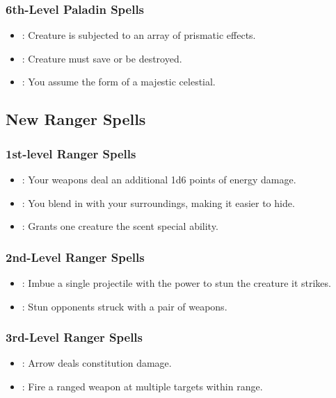 \subsubsection{6th-Level Paladin Spells}
\begin{itemize}
 \item {}: Creature is subjected to an array of prismatic effects.
 \item {}: Creature must save or be destroyed.
 \item {}: You assume the form of a majestic celestial.
\end{itemize}


\subsection{New Ranger Spells}
\subsubsection{1st-level Ranger Spells}
\begin{itemize}
 \item {}: Your weapons deal an additional 1d6 points of energy damage.
 \item {}: You blend in with your surroundings, making it easier to hide.
 \item {}: Grants one creature the scent special ability.
\end{itemize}
\subsubsection{2nd-Level Ranger Spells}
\begin{itemize}
 \item {}: Imbue a single projectile with the power to stun the creature it strikes.
 \item {}: Stun opponents struck with a pair of weapons.
\end{itemize}
\subsubsection{3rd-Level Ranger Spells}
\begin{itemize}
 \item {}: Arrow deals constitution damage.
 \item {}: Fire a ranged weapon at multiple targets within range.
\end{itemize}
